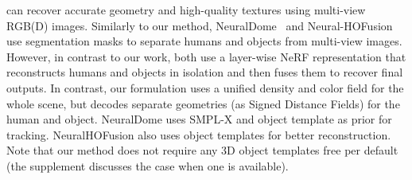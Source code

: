 can recover accurate geometry and high-quality textures using multi-view RGB(D) images. 
Similarly to our method, NeuralDome~\cite{zhang2023neuraldome} and Neural-HOFusion~\cite{jiang2022neuralhofusion} use segmentation masks to separate humans and objects from multi-view images. 
However, in contrast to our work, both use a layer-wise NeRF representation that reconstructs humans and objects in isolation and then fuses them to recover final outputs. 
In contrast, our formulation uses a unified density and color field for the whole scene, but decodes separate geometries (as Signed Distance Fields) for the human and object. 
NeuralDome \cite{zhang2023neuraldome} uses SMPL-X and object template as prior for tracking. 
NeuralHOFusion \cite{jiang2022neuralhofusion} also uses object templates for better reconstruction. 
Note that our method does not require any 3D object templates free per default (the supplement discusses the case when one is available). 
